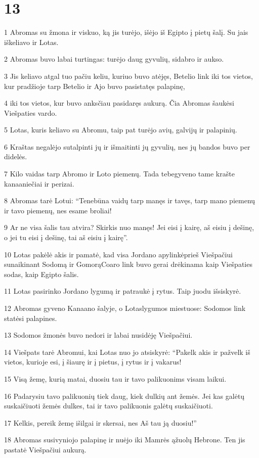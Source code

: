 \chapter{13}


\par 1 Abromas su žmona ir viskuo, ką jis turėjo, išėjo iš Egipto į pietų šalį. Su jais iškeliavo ir Lotas. 
\par 2 Abromas buvo labai turtingas: turėjo daug gyvulių, sidabro ir aukso. 
\par 3 Jis keliavo atgal tuo pačiu keliu, kuriuo buvo atėjęs, Betelio link iki tos vietos, kur pradžioje tarp Betelio ir Ajo buvo pasistatęs palapinę, 
\par 4 iki tos vietos, kur buvo anksčiau pasidaręs aukurą. Čia Abromas šaukėsi Viešpaties vardo. 
\par 5 Lotas, kuris keliavo su Abromu, taip pat turėjo avių, galvijų ir palapinių. 
\par 6 Kraštas negalėjo sutalpinti jų ir išmaitinti jų gyvulių, nes jų bandos buvo per didelės. 
\par 7 Kilo vaidas tarp Abromo ir Loto piemenų. Tada tebegyveno tame krašte kanaaniečiai ir perizai. 
\par 8 Abromas tarė Lotui: “Tenebūna vaidų tarp manęs ir tavęs, tarp mano piemenų ir tavo piemenų, nes esame broliai! 
\par 9 Ar ne visa šalis tau atvira? Skirkis nuo manęs! Jei eisi į kairę, aš eisiu į dešinę, o jei tu eisi į dešinę, tai aš eisiu į kairę”. 
\par 10 Lotas pakėlė akis ir pamatė, kad visa Jordano apylinkė­prieš Viešpačiui sunaikinant Sodomą ir Gomorą­Coaro link buvo gerai drėkinama kaip Viešpaties sodas, kaip Egipto šalis. 
\par 11 Lotas pasirinko Jordano lygumą ir patraukė į rytus. Taip juodu išsiskyrė. 
\par 12 Abromas gyveno Kanaano šalyje, o Lotas­lygumos miestuose: Sodomos link statėsi palapines. 
\par 13 Sodomos žmonės buvo nedori ir labai nusidėję Viešpačiui. 
\par 14 Viešpats tarė Abromui, kai Lotas nuo jo atsiskyrė: “Pakelk akis ir pažvelk iš vietos, kurioje esi, į šiaurę ir į pietus, į rytus ir į vakarus! 
\par 15 Visą žemę, kurią matai, duosiu tau ir tavo palikuonims visam laikui. 
\par 16 Padarysiu tavo palikuonių tiek daug, kiek dulkių ant žemės. Jei kas galėtų suskaičiuoti žemės dulkes, tai ir tavo palikuonis galėtų suskaičiuoti. 
\par 17 Kelkis, pereik žemę išilgai ir skersai, nes Aš tau ją duosiu!” 
\par 18 Abromas susivyniojo palapinę ir nuėjo iki Mamrės ąžuolų Hebrone. Ten jis pastatė Viešpačiui aukurą.



